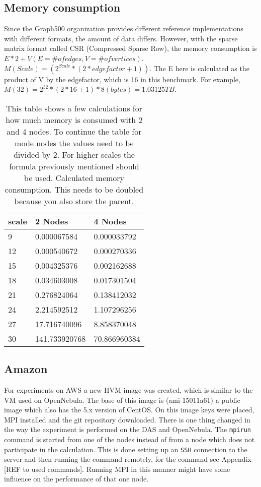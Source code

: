 \subsection{Memory consumption}
Since the Graph500 organization provides different reference implementations with different formats, the amount of data differs. However, with the sparse matrix format called CSR (Compressed Sparse Row), the memory consumption is $E*2 + V (E = \# of edges, V = \# of vertices)$.
$M(Scale) = (2^{Scale} *(2*edgefactor + 1))$. The E here is calculated as the product of V by the edgefactor, which is 16 in this benchmark. For
example, $M(32) = 2^{32} * (2*16+1) * 8 (bytes) = 1.03125 TB$.
\begin{table} [!h]
\begin{tabular}{|l|l|l|}
\hline
scale & 2 Nodes& 4 Nodes \\ \hline
9 & 0.000067584	&	0.000033792 \\ \hline
12 & 0.000540672	&	0.000270336\\ \hline
15 & 0.004325376	&	0.002162688\\ \hline
18 & 0.034603008	&	0.017301504\\ \hline
21 & 0.276824064	&	0.138412032\\ \hline
24 & 2.214592512	&	1.107296256\\ \hline
27 & 17.716740096	&	8.858370048\\ \hline
30 & 141.733920768	&	70.866960384\\ \hline


\end{tabular}
\caption{This table shows a few calculations for how much memory is consumed with 2 and 4 nodes. To continue the table for mode nodes the values need to be divided by 2. For higher scales the formula previously mentioned should be used. Calculated memory consumption. This needs to be doubled because you also store the parent.}
\label{tab:calculation memory consumption}
\end{table}
    
\subsection{Amazon}
For experiments on AWS a new HVM image was created, which is similar to the VM used on OpenNebula. The base of this image is (ami-15011a61) a public image which also has the 5.x version of CentOS. On this image keys were placed, MPI installed and the git repository downloaded. There is one thing changed in the way the experiment is performed on the DAS and OpenNebula. The \texttt{mpirun} command is started from one of the nodes instead of from a node which does not participate in the calculation. This is done setting up an \texttt{SSH} connection to the server and then running the command remotely, for the command see Appendix [REF to used commands]. Running MPI in this manner might have some influence on the performance of that one node.